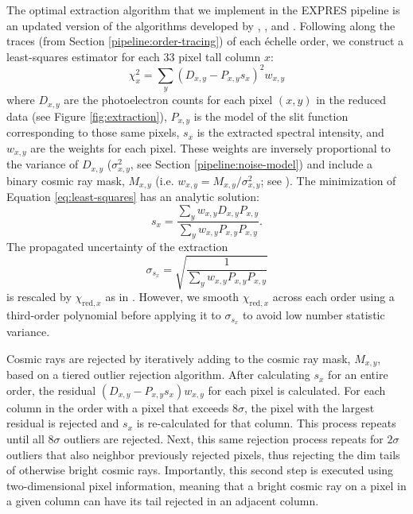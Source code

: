The optimal extraction algorithm that we implement in the EXPRES pipeline is an updated version of the algorithms developed by \citet{horne_optimal_1986}, \citet{piskunov_new_2002}, and \citet{zechmeister_flat-relative_2014}. Following along the traces (from Section \ref{pipeline:order-tracing}) of each \'echelle order, we construct a least-squares estimator for each 33 pixel tall column $x$:
\begin{equation}
    \chi_x^2 = \sum_y ( D_{x,y} - P_{x,y} s_x )^2  w_{x,y}
    \label{eq:least-squares}
\end{equation}
where $D_{x,y}$ are the photoelectron counts for each pixel $(x,y)$ in the reduced data (see Figure \ref{fig:extraction}), $P_{x,y}$ is the model of the slit function corresponding to those same pixels, $s_x$ is the extracted spectral intensity, and $w_{x,y}$ are the weights for each pixel. These weights are inversely proportional to the variance of $D_{x,y}$ ($\sigma_{x,y}^2$, see Section \ref{pipeline:noise-model}) and include a binary cosmic ray mask, $M_{x,y}$ (i.e. $w_{x,y} = M_{x,y} / \sigma^2_{x,y}$; see \citealt{zechmeister_flat-relative_2014}). The minimization of Equation \ref{eq:least-squares} has an analytic solution:
\begin{equation}
    s_x = \frac{\sum_y w_{x,y} D_{x,y} P_{x,y} }{\sum_y w_{x,y} P_{x,y} P_{x,y} }.
    \label{eq:least-squares-soln}
\end{equation}
The propagated uncertainty of the extraction
\begin{equation}
    \sigma_{s_x} = \sqrt{\frac{1}{\sum_y w_{x,y} P_{x,y} P_{x,y}}}
\end{equation}
is rescaled by $\chi_{\mathrm{red,}x}$ as in \citet{zechmeister_flat-relative_2014}. However, we smooth $\chi_{\mathrm{red,}x}$ across each order using a third-order polynomial before applying it to $\sigma_{s_x}$ to avoid low number statistic variance.

Cosmic rays are rejected by iteratively adding to the cosmic ray mask, $M_{x,y}$, based on a tiered outlier rejection algorithm. After calculating $s_x$ for an entire order, the residual $(D_{x,y}-P_{x,y}s_x)w_{x,y}$ for each pixel is calculated. For each column in the order with a pixel that exceeds $8\sigma$, the pixel with the largest residual is rejected and $s_x$ is re-calculated for that column. This process repeats until all $8\sigma$ outliers are rejected. Next, this same rejection process repeats for $2\sigma$ outliers that also neighbor previously rejected pixels, thus rejecting the dim tails of otherwise bright cosmic rays. Importantly, this second step is executed using two-dimensional pixel information, meaning that a bright cosmic ray on a pixel in a given column can have its tail rejected in an adjacent column.

